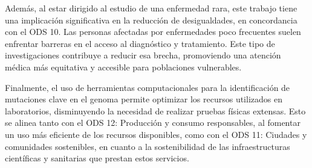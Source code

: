 \documentclass[11pt,spanish,listoffigures,listoftables]{tfgetsinf}
\begin{document}
Además, al estar dirigido al estudio de una enfermedad rara, este trabajo tiene una implicación significativa en la reducción de desigualdades, en concordancia con el \acs{ODS} 10. Las personas afectadas por enfermedades poco frecuentes suelen enfrentar barreras en el acceso al diagnóstico y tratamiento. Este tipo de investigaciones contribuye a reducir esa brecha, promoviendo una atención médica más equitativa y accesible para poblaciones vulnerables.

Finalmente, el uso de herramientas computacionales para la identificación de mutaciones clave en el genoma permite optimizar los recursos utilizados en laboratorios, disminuyendo la necesidad de realizar pruebas físicas extensas. Esto se alinea tanto con el \acs{ODS} 12: Producción y consumo responsables, al fomentar un uso más eficiente de los recursos disponibles, como con el \acs{ODS} 11: Ciudades y comunidades sostenibles, en cuanto a la sostenibilidad de las infraestructuras científicas y sanitarias que prestan estos servicios.







\end{document}
